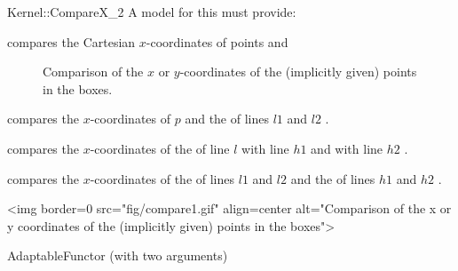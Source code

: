 \begin{ccRefFunctionObjectConcept}{Kernel::CompareX_2}
A model for this must provide:


      {compares the Cartesian $x$-coordinates of points  and
      }

\begin{ccTexOnly}
\begin{figure}[h]
\centerline{}
\caption{Comparison of the $x$ or $y$-coordinates of the (implicitly
given) points in the boxes.\label{fig-compare12}}
\end{figure} 
\end{ccTexOnly} 

        {compares the $x$-coordinates of $p$ and the  
         of lines $l1$ and $l2$%
         .}


        {compares the $x$-coordinates of  the  of line $l$
         with line $h1$ and with line $h2$%
         .}


        {compares the $x$-coordinates of the  of lines $l1$
         and $l2$ and  the  of lines $h1$ and $h2$%
         .}

\begin{ccHtmlOnly}
<img border=0 src="fig/compare1.gif" align=center alt="Comparison of the x 
or y coordinates of the (implicitly given) points in the boxes">
\end{ccHtmlOnly} 

\ccRefines
AdaptableFunctor (with two arguments)

\ccSeeAlso
{}  \\

\end{ccRefFunctionObjectConcept}
